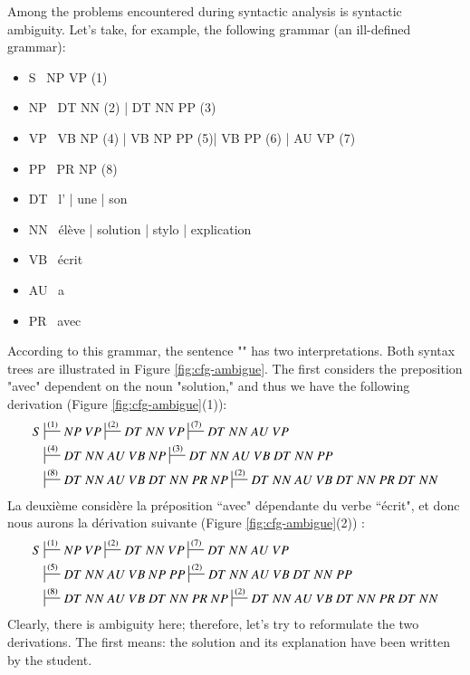 \documentclass{KodeBook}
\begin{document}
Among the problems encountered during syntactic analysis is syntactic ambiguity. 
Let's take, for example, the following grammar (an ill-defined grammar):
\begin{itemize}
	\item S \textrightarrow\ NP VP (1)
	\item NP \textrightarrow\ DT NN (2) | DT NN PP (3)
	\item VP \textrightarrow\ VB NP (4) | VB NP PP (5)| VB PP (6) | AU VP (7)
	\item PP \textrightarrow\ PR NP (8)
	\item DT \textrightarrow\ l' | une | son 
	\item NN \textrightarrow\ élève | solution | stylo | explication 
	\item VB \textrightarrow\ écrit 
	\item AU \textrightarrow\ a
	\item PR \textrightarrow\ avec
\end{itemize}
According to this grammar, the sentence "" has two interpretations. 
Both syntax trees are illustrated in Figure \ref{fig:cfg-ambigue}.
The first considers the preposition "avec" dependent on the noun "solution," and thus we have the following derivation (Figure \ref{fig:cfg-ambigue}(1)):
\begin{align*}
S & \sststile{}{(1)} NP\ VP \sststile{}{(2)} DT\ NN\ VP \sststile{}{(7)} DT\ NN\ AU\ VP \\
  & \sststile{}{(4)} DT\ NN\ AU\ VB\ NP \sststile{}{(3)} DT\ NN\ AU\ VB\ DT\ NN\ PP \\
  & \sststile{}{(8)} DT\ NN\ AU\ VB\ DT\ NN\ PR\ NP 
   \sststile{}{(2)} DT\ NN\ AU\ VB\ DT\ NN\ PR\ DT\ NN 
\end{align*}
La deuxième considère la préposition ``avec" dépendante du verbe ``écrit", et donc nous aurons la dérivation suivante (Figure \ref{fig:cfg-ambigue}(2)) :
\begin{align*}
S & \sststile{}{(1)} NP\ VP \sststile{}{(2)} DT\ NN\ VP \sststile{}{(7)} DT\ NN\ AU\ VP \\
& \sststile{}{(5)} DT\ NN\ AU\ VB\ NP\ PP \sststile{}{(2)} DT\ NN\ AU\ VB\ DT\ NN\ PP \\
& \sststile{}{(8)} DT\ NN\ AU\ VB\ DT\ NN\ PR\ NP 
 \sststile{}{(2)} DT\ NN\ AU\ VB\ DT\ NN\ PR\ DT\ NN 
\end{align*}
Clearly, there is ambiguity here; therefore, let's try to reformulate the two derivations.
The first means: the solution and its explanation have been written by the student. 
\end{document}
